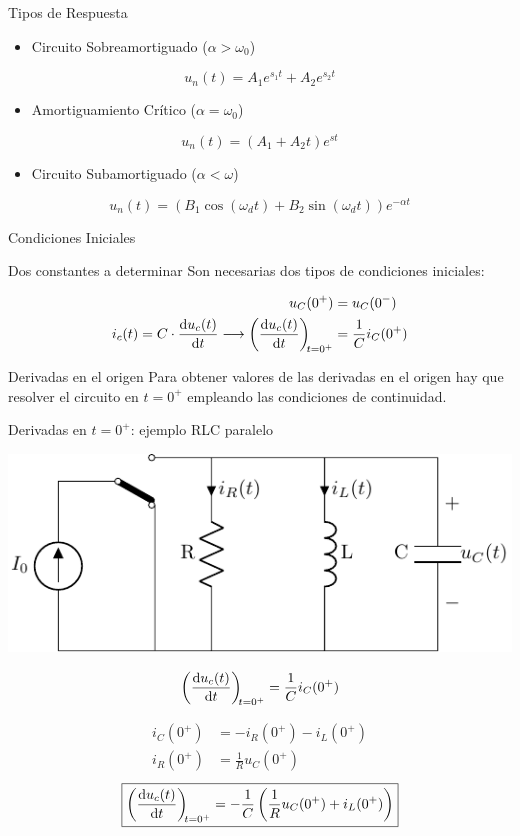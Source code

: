 \documentclass[aspectratio=169, usenames,svgnames,dvipsnames]{beamer}
\begin{document}
\begin{frame}[label={sec:orgf101695}]{Tipos de Respuesta}
\begin{itemize}
\item Circuito Sobreamortiguado (\(\alpha > \omega_0\))
\end{itemize}
\[
  \boxed{u_n(t) = A_1 e^{s_1 t} + A_2 e^{s_2 t}}
\]
\begin{itemize}
\item Amortiguamiento Crítico (\(\alpha = \omega_0\))
\end{itemize}
\[
  \boxed{u_n(t) = (A_1 + A_2 t) e^{s t} }
\]

\begin{itemize}
\item Circuito Subamortiguado (\(\alpha < \omega\))
\end{itemize}
\[
  \boxed{u_n(t) = (B_1\cos(\omega_d t) + B_2\sin(\omega_d t)) e^{-\alpha t}}
\]
\end{frame}
\begin{frame}[label={sec:org48b3298}]{Condiciones Iniciales}
\begin{block}{Dos constantes a determinar}
Son necesarias dos tipos de condiciones iniciales:


\begin{align*}
  u_C(0^+) &= u_C(0^-)\\
  i_c(t) = C \cdot \diff{u_c(t)}{t} \longrightarrow \diff{u_c(t)}{t}[t = 0^+] &= \frac{1}{C}i_C(0^+)
\end{align*}
\end{block}
\begin{block}{Derivadas en el origen}
Para obtener valores de las derivadas en el origen hay que resolver el circuito en \(t = 0^+\) empleando las condiciones de continuidad.
\end{block}
\end{frame}
\begin{frame}[label={sec:org3650164}]{Derivadas en \(t = 0^+\): ejemplo RLC paralelo}
\begin{center}
\includegraphics[height=0.25\textheight]{../figs/transitorio_circuitoRLC_paralelo_t0+.pdf}
\end{center}

\[
  \diff{u_c(t)}{t}[t = 0^+] = \frac{1}{C}i_C(0^+)
\]

\begin{align*}
  i_C(0^+) &= -i_R(0^+) - i_L(0^+)\\
  i_R(0^+) &= \frac{1}{R} u_C(0^+)
\end{align*}
\[
  \boxed{\diff{u_c(t)}{t}[t = 0^+] = - \frac{1}{C} \left( \frac{1}{R} u_C(0^+) +  i_L(0^+)\right)}
\]
\end{frame}
\end{document}
